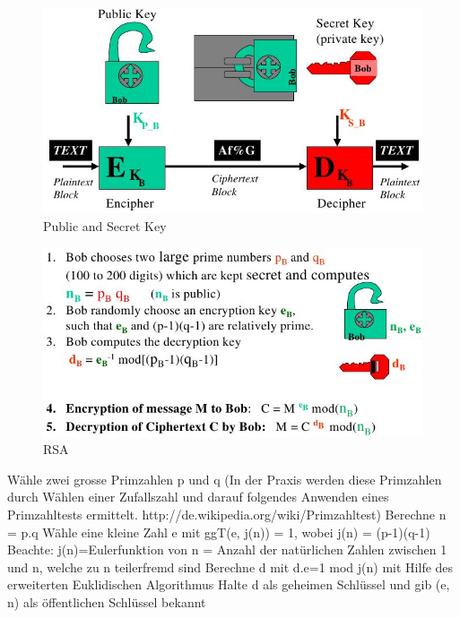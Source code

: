 \documentclass[ngerman,a4paper,12pt]{scrreprt}
\begin{document}
\begin{figure}[H]
	\centering
	\includegraphics[width=\textwidth]{img/V5.5.jpg}
	\caption{Public and Secret Key}
	\label{}
\end{figure}

\begin{figure}[H]
	\centering
	\includegraphics[width=\textwidth]{img/V5.6.jpg}
	\caption{RSA}
	\label{}
\end{figure}


\ul
	\li  Wähle zwei grosse Primzahlen p und q (In der Praxis werden diese Primzahlen durch
	Wählen einer Zufallszahl und darauf folgendes Anwenden eines Primzahltests
ermittelt. http://de.wikipedia.org/wiki/Primzahltest)
 \li Berechne n = p.q
 \li Wähle eine kleine Zahl e mit ggT(e, j(n)) = 1, wobei j(n) = (p-1)(q-1) Beachte:
j(n)=Eulerfunktion von n = Anzahl der natürlichen Zahlen zwischen 1 und n, welche zu
n teilerfremd sind
 \li Berechne d mit d.e=1 mod j(n) mit Hilfe des erweiterten Euklidischen Algorithmus
 \li Halte d als geheimen Schlüssel und gib (e, n) als öffentlichen Schlüssel bekannt
\ulE
\end{document}
